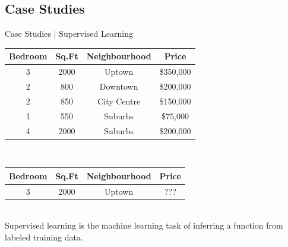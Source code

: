 \documentclass[10pt]{beamer}
\begin{document}
		\subsection{Case Studies}
			\begin{frame}{Case Studies | Supervised Learning}
				\begin{center}
					\begin{tabular}{|c|c|c|c|}							\hline 
						\bfseries{Bedroom} & \bfseries{Sq.Ft} & \bfseries{Neighbourhood} & \bfseries{Price}\\ 	\hline
						3       & 2000  & Uptown        & \$350,000 \\ 	\hline 
						2       & 800   & Downtown      & \$200,000 \\ 	\hline 
						2       & 850   & City Centre   & \$150,000 \\ 	\hline 
						1       & 550   & Suburbs       & \$75,000 \\	\hline 
						4       & 2000  & Suburbs       & \$200,000 \\	\hline 
					\end{tabular}\\
					\bigskip
					\begin{tabular}{|c|c|c|c|}							\hline 
						\bfseries{Bedroom} & \bfseries{Sq.Ft} & \bfseries{Neighbourhood} & \bfseries{Price}\\ 	\hline
						3   	& 2000  & Uptown        & ???\\			\hline 
					\end{tabular} \\
					\bigskip
					Supervised learning is the machine learning task of inferring a function from labeled training data.
				\end{center} 
			\end{frame}
\end{document}
